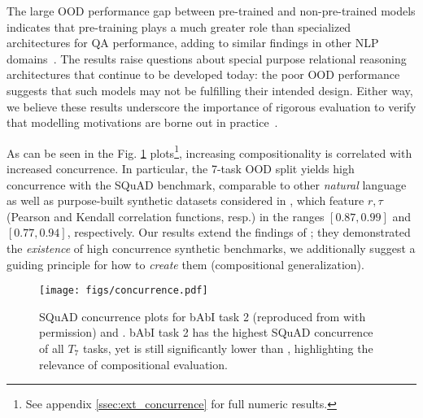  The large OOD performance gap between pre-trained and non-pre-trained models indicates that pre-training plays a much greater role than specialized architectures for QA performance, adding to similar findings in other NLP domains~\citep{hendrycks-etal-2020-pretrained}. The results raise questions about special purpose relational reasoning architectures that continue to be developed today: the poor OOD performance suggests that such models may not be fulfilling their intended design. Either way, we believe these results underscore the importance of rigorous evaluation to verify that modelling motivations are borne out in practice~\citep{aina-etal-2019-entity}. 

 As can be seen in the Fig. \ref{fig:concurrence} plots\footnote{See appendix \ref{ssec:ext_concurrence} for full numeric results.}, increasing compositionality is correlated with increased concurrence. In particular, the 7-task OOD split yields high concurrence with the SQuAD benchmark, comparable to other \emph{natural} language as well as purpose-built synthetic datasets considered in \citet{liu2021small}, which feature $r,\tau$ (Pearson and Kendall correlation functions, resp.) in the ranges $\left[0.87,0.99\right]$ and $\left[0.77,0.94\right]$, respectively. Our results extend the findings of \citet{liu2021small}; they demonstrated the \emph{existence} of high concurrence synthetic benchmarks, we additionally suggest a guiding principle for how to \emph{create} them (compositional generalization). 



\begin{figure}
\centering
\texttt{[image: figs/concurrence.pdf]}

\caption{\label{fig:concurrence} SQuAD concurrence plots for bAbI task 2 (reproduced from \citet{liu2021small} with permission) and . bAbI task 2 has the highest SQuAD concurrence of all $T_7$ tasks, yet is still significantly lower than , highlighting the relevance of compositional evaluation.}
\end{figure}

 









